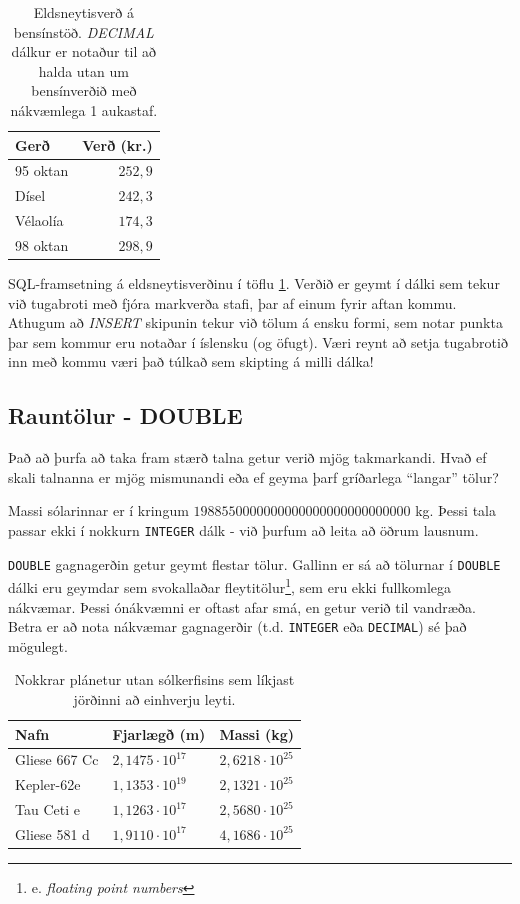 \begin{table}
\centering
\caption[Eldsneyti]{Eldsneytisverð á bensínstöð. \emph{DECIMAL} dálkur er notaður til að halda utan um bensínverðið með nákvæmlega 1 aukastaf.}
\label{tafla:eldsneyti}
\begin{tabular}{lr}
\toprule
Gerð&Verð (kr.)\\
\midrule
95 oktan&$252,9$\\
Dísel&$242,3$\\
Vélaolía&$174,3$\\
98 oktan&$298,9$\\
\bottomrule
\end{tabular}
\end{table}

\begin{example}
\caption[Eldsneytisverð]{SQL-framsetning á eldsneytisverðinu í töflu \ref{tafla:eldsneyti}. Verðið er geymt í dálki sem tekur við tugabroti með fjóra markverða stafi, þar af einum fyrir aftan kommu. Athugum að \emph{INSERT} skipunin tekur við tölum á ensku formi, sem notar punkta þar sem kommur eru notaðar í íslensku (og öfugt). Væri reynt að setja tugabrotið inn með kommu væri það túlkað sem skipting á milli dálka!}
\label{sql:k3d6-eldsneyti}
\centering
{}
\end{example}

\subsection{Rauntölur - DOUBLE}
Það að þurfa að taka fram stærð talna getur verið mjög takmarkandi. Hvað ef skali talnanna er mjög mismunandi eða ef geyma þarf gríðarlega ``langar'' tölur? 

Massi sólarinnar er í kringum $1988550000000000000000000000000$ kg. Þessi tala passar ekki í nokkurn \verb|INTEGER| dálk - við þurfum að leita að öðrum lausnum.

\verb|DOUBLE| gagnagerðin getur geymt flestar tölur. Gallinn er sá að tölurnar í \verb|DOUBLE| dálki eru geymdar sem svokallaðar fleytitölur\footnote{e. \emph{floating point numbers}}, sem eru ekki fullkomlega nákvæmar. Þessi ónákvæmni er oftast afar smá, en getur verið til vandræða. Betra er að nota nákvæmar gagnagerðir (t.d. \verb|INTEGER| eða \verb|DECIMAL|) sé það mögulegt.

\begin{table}
\centering
\caption[Plánetur utan sólkerfisins.]{Nokkrar plánetur utan sólkerfisins sem líkjast jörðinni að einhverju leyti.}
\label{tafla:planetur}
\begin{tabular}{lll}
\toprule
Nafn&Fjarlægð (m)&Massi (kg)\\
\midrule
Gliese 667 Cc&$2,1475\cdot 10^{17}$&$2,6218\cdot10^{25}$\\
Kepler-62e   &$1,1353\cdot 10^{19}$&$2,1321\cdot10^{25}$\\
Tau Ceti e   &$1,1263\cdot 10^{17}$&$2,5680\cdot10^{25}$\\
Gliese 581 d &$1,9110\cdot 10^{17}$&$4,1686\cdot10^{25}$\\
\bottomrule
\end{tabular}
\end{table}

